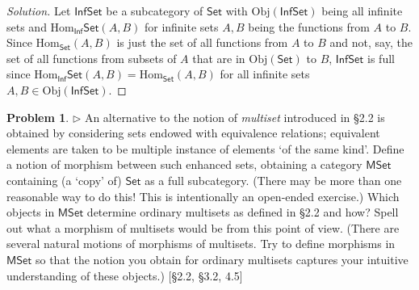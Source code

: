 \documentclass[fontsize=14pt]{scrartcl}
\theoremstyle{definition}
\newtheorem{problem-internal}{Problem}[subsection]
\newenvironment{problem}{
  \medskip
  \begin{problem-internal}
}{
  \end{problem-internal}
}
\newenvironment{solution}{
  \begin{proof}[Solution]
  \vspace{-8px}
  \setlength{\parskip}{4px}
  \setlength{\parindent}{0px}
}{
  \end{proof}
}
\newcommand{\Obj}{\mathrm{Obj}}
\newcommand{\Hom}{\mathrm{Hom}}
\begin{document}
\begin{solution}
\def \C {\mathsf{C}}
\def \Cp {\C'}
\def \Set {\mathsf{Set}}
\def \ISet {\mathsf{Inf}\mathsf{Set}}

Let $\ISet$ be a subcategory of $\Set$ with $\Obj(\ISet)$ being all infinite
sets and $\Hom_\ISet(A,B)$ for infinite sets $A,B$ being the functions from $A$
to $B$. Since $\Hom_\Set(A,B)$ is just the set of all functions from $A$ to $B$
and not, say, the set of all functions from subsets of $A$ that are in
$\Obj(\Set)$ to $B$, $\ISet$ is full since $\Hom_\ISet(A,B)=\Hom_\Set(A,B)$ for
all infinite sets $A,B\in\Obj(\ISet)$.
\end{solution}


\begin{problem}
\def \Set {\mathsf{Set}}
\def \MSet {\mathsf{MSet}}

$\rhd$ An alternative to the notion of \textit{multiset} introduced in
\S2.2 is obtained by considering sets endowed with equivalence relations;
equivalent elements are taken to be multiple instance of elements `of the same
kind'. Define a notion of morphism between such enhanced sets, obtaining a
category $\MSet$ containing (a `copy' of) $\Set$ as a full subcategory. (There
may be more than one reasonable way to do this! This is intentionally an
open-ended exercise.) Which objects in $\MSet$ determine ordinary multisets as
defined in \S2.2 and how? Spell out what a morphism of multisets would be from
this point of view. (There are several natural motions of morphisms of
multisets. Try to define morphisms in $\MSet$ so that the notion you obtain for
ordinary multisets captures your intuitive understanding of these objects.)
[\S2.2, \S3.2, 4.5]
\end{problem}
\end{document}
